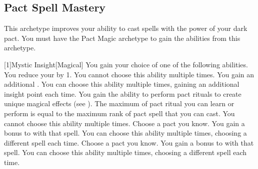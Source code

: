 



    \subsection{Pact Spell Mastery}
        This archetype improves your ability to cast spells with the power of your dark pact.
        You must have the Pact Magic archetype to gain the abilities from this archetype.

        [1]{Mystic Insight}[Magical] You gain your choice of one of the following abilities.
        {
             You reduce your  by 1.
                You cannot choose this ability multiple times.
             You gain an additional .
                You can choose this ability multiple times, gaining an additional insight point each time.
             You gain the ability to perform pact rituals to create unique magical effects (see ).
                The maximum  of pact ritual you can learn or perform is equal to the maximum rank of pact spell that you can cast.
                You cannot choose this ability multiple times.
             Choose a pact  you know.
                You gain a  bonus to  with that spell.
                You can choose this ability multiple times, choosing a different spell each time.
             Choose a pact  you know.
                You gain a  bonus to  with that spell.
                You can choose this ability multiple times, choosing a different spell each time.
        }

